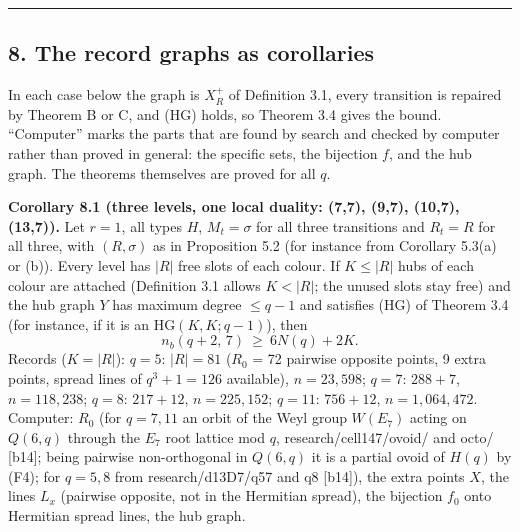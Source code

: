 \documentclass[
  11pt,
]{article}
\begin{document}
\begin{center}\rule{0.5\linewidth}{0.5pt}\end{center}

\hypertarget{the-record-graphs-as-corollaries}{%
\subsection{8. The record graphs as corollaries}\label{the-record-graphs-as-corollaries}}

In each case below the graph is \(X_R^+\) of Definition 3.1, every transition is repaired by Theorem B or C, and (HG)
holds, so Theorem 3.4 gives the bound. ``Computer'' marks the parts that are found by search and checked by computer
rather than proved in general: the specific sets, the bijection \(f\), and the hub graph. The theorems themselves are
proved for all \(q\).

\textbf{Corollary 8.1 (three levels, one local duality: (7,7), (9,7), (10,7), (13,7)).} Let \(r = 1\), all types \(H\),
\(M_t = \sigma\) for all three transitions and \(R_t = R\) for all three, with \((R,\sigma)\) as in Proposition 5.2 (for
instance from Corollary 5.3(a) or (b)). Every level has \(\lvert R\rvert\) free slots of each colour. If
\(K\le\lvert R\rvert\) hubs of each colour are attached (Definition 3.1 allows \(K < \lvert R\rvert\); the unused slots
stay free) and the hub graph \(Y\) has maximum degree \(\le q-1\) and satisfies (HG) of Theorem 3.4 (for instance, if it
is an \(\mathrm{HG}(K,K;q-1)\)), then \[n_b(q+2,\,7)\ \ge\ 6N(q) + 2K .\] Records (\(K = \lvert R\rvert\)): \(q = 5\):
\(\lvert R\rvert = 81\) (\(R_0\) = 72 pairwise opposite points, 9 extra points, spread lines of \(q^3+1 = 126\)
available), \(n = 23{,}598\); \(q = 7\): \(288 + 7\), \(n = 118{,}238\); \(q = 8\): \(217 + 12\), \(n = 225{,}152\);
\(q = 11\): \(756 + 12\), \(n = 1{,}064{,}472\). Computer: \(R_0\) (for \(q = 7, 11\) an orbit of the Weyl group
\(W(E_7)\) acting on \(Q(6,q)\) through the \(E_7\) root lattice mod \(q\), research/cell147/ovoid/ and octo/ {[}b14{]};
being pairwise non-orthogonal in \(Q(6,q)\) it is a partial ovoid of \(H(q)\) by (F4); for \(q = 5, 8\) from
research/d13D7/q57 and q8 {[}b14{]}), the extra points \(X\), the lines \(L_x\) (pairwise opposite, not in the Hermitian
spread), the bijection \(f_0\) onto Hermitian spread lines, the hub graph.
\end{document}
